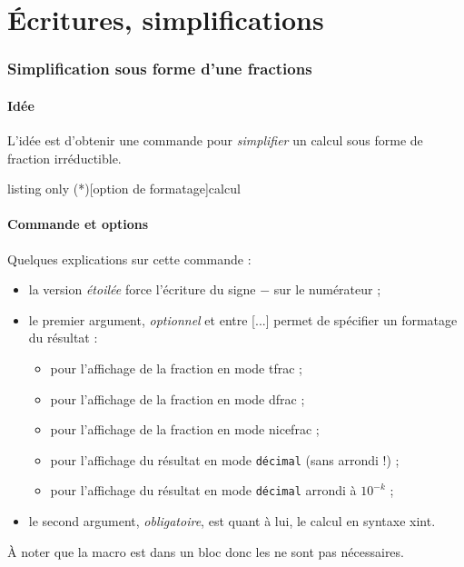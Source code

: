 \part{Écritures, simplifications}

\section{Simplification sous forme d'une fractions}\label{convfrac}

\subsection{Idée}

\begin{tipblock}
L'idée est d'obtenir une commande pour \textit{simplifier} un calcul sous forme de fraction irréductible.
\end{tipblock}

\begin{PresCodeTexPL}{listing only}
\ConversionFraction(*)[option de formatage]{calcul}
\end{PresCodeTexPL}

\subsection{Commande et options}

\begin{cautionblock}
Quelques explications sur cette commande :

\begin{itemize}
	\item {} la version \textit{étoilée} force l'écriture du signe \og $-$ \fg{} sur le numérateur ;
	\item le premier argument, \textit{optionnel} et entre \textsf{[...]} permet de spécifier un formatage du résultat :
	\begin{itemize}
			\item {} pour l'affichage de la fraction en mode \textsf{tfrac} ;
			\item {} pour l'affichage de la fraction en mode \textsf{dfrac} ;
			\item {} pour l'affichage de la fraction en mode \textsf{nicefrac} ;
			\item {} pour l'affichage du résultat en mode \texttt{décimal} (sans arrondi !) ;
			\item {} pour l'affichage du résultat en mode \texttt{décimal} arrondi à $10^{-k}$ ;
		\end{itemize}
	\item le second argument, \textit{obligatoire}, est quant à lui, le calcul en syntaxe \textsf{xint}.
\end{itemize}

À noter que la macro est dans un bloc  donc les  ne sont pas nécessaires.
\end{cautionblock}

